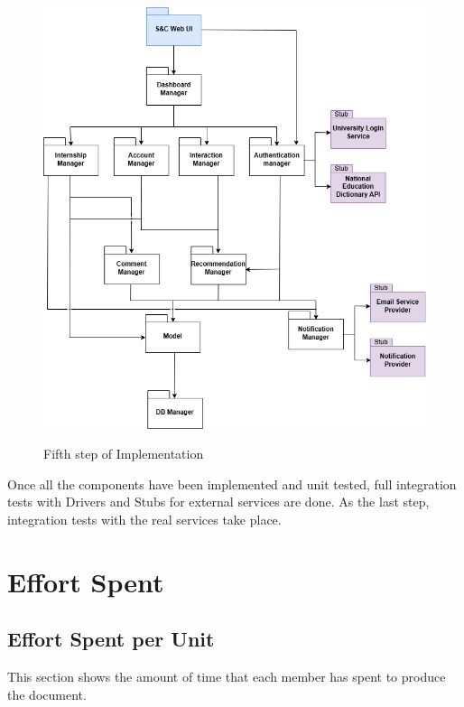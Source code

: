 \documentclass[a4paper,12pt]{article}
\begin{document}
\begin{figure}[H]
\centering
\includegraphics[scale = 0.64]{DD_figures/ImplementationDiagrams/FifthStep.png}\\
\caption{Fifth step of Implementation}
\end{figure}
Once all the components have been implemented and unit tested, full integration tests with Drivers and Stubs for external services are done. As the last step, integration tests with the
real services take place.
\newpage

\section{Effort Spent}
\subsection{Effort Spent per Unit}
This section shows the amount of time that each member has spent to produce the document. 
\end{document}
